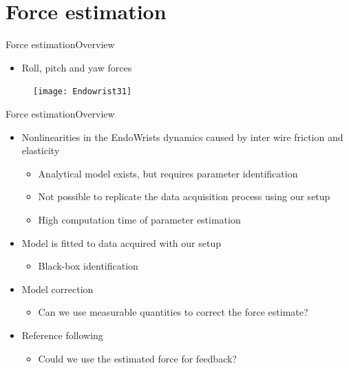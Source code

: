 \section{Force estimation}

\begin{frame}{Force estimation}{Overview}
\begin{itemize}
  	\item Roll, pitch and yaw forces
\end{itemize}
 \begin{figure}[h]
 \centering
 \texttt{[image: Endowrist31]}
 \label{fig:ewr}
 \end{figure}
\end{frame}

\begin{frame}{Force estimation}{Overview}
\begin{itemize}
\item Nonlinearities in the EndoWrists dynamics caused by inter wire friction and elasticity
	\begin{itemize}
		\item Analytical model exists, but requires parameter identification
		\item Not possible to replicate the data acquisition process using our setup
		\item High computation time of parameter estimation
	\end{itemize}
	
\item Model is fitted to data acquired with our setup
	\begin{itemize}
		\item Black-box identification
	\end{itemize}

\item Model correction
	\begin{itemize}
		\item Can we use measurable quantities to correct the force estimate?
	\end{itemize}

\item Reference following
	\begin{itemize}
		\item Could we use the estimated force for feedback?
	\end{itemize}
\end{itemize}
\end{frame}

